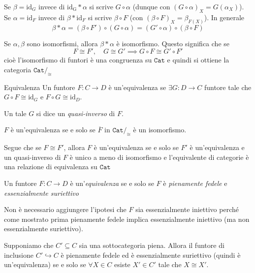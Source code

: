\begin{note}[zione]
    Se \(\beta = \mathrm{id}_G \) invece di \(\mathrm{id_G} * \alpha\) si scrive
    \(G \circ \alpha\) (dunque con \({(G \circ \alpha)}_X = G{(\alpha_X)}\)). Se
    \(\alpha = \mathrm{id}_F\) invece di \(\beta * \mathrm{id}_F\) si scrive \(\beta \circ F\) (con \({(\beta \circ F)}_X = \beta_{F{(X)}} \)). In generale 
    \[
      \beta * \alpha = {(\beta \circ F')} \circ {(G \circ \alpha)} = {(G' \circ
      \alpha)} \circ {(\beta \circ F)}
    \]
\end{note}
\begin{remark}{}
    Se \(\alpha, \beta\) sono isomorfismi, allora \(\beta * \alpha\) è
    isomorfismo. Questo significa che se 
    \[
      F \cong F', \quad G \cong G' \implies G \circ F \cong G' \circ F'
    \]
    cioè l'isomorfismo di funtori è una congruenza su \(
    \mathtt{Cat}\) e quindi si ottiene la categoria \(\mathtt{Cat} /_{\cong}\)
\end{remark}
\begin{definition}{Equivalenza}
    Un funtore \(F: C \to D\) è un'equivalenza se \(\exists G : D \to C\)
    funtore tale che \(G \circ F \cong \mathrm{id}_G\) e \(F \circ G \cong \mathrm{id}_D\).

    Un tale \(G\) si dice un \emph{quasi-inverso} di \(F\).
\end{definition}
\begin{remark}{}
    \(F\) è un'equivalenza se e solo se \(\overline{F} \text{ in } \mathtt{Cat}/_{\cong} \) è un isomorfismo.
\end{remark}

Segue che se \(F \cong F'\), allora \(F\) è un'equivalenza se e solo se \(F'\) è
un'equivalenza e un quasi-inverso di \(F\) è unico a meno di isomorfismo e
l'equivalente di categorie è una relazione di equivalenza su \(\mathtt{Cat}\) 

\begin{theorem}
    Un funtore \(F : C \to D\) è un'\emph{equivalenza} se e solo se \(F\) è \emph{pienamente fedele} e \emph{essenzialmente suriettivo}
\end{theorem}
\begin{remark}{}
    Non è necessario aggiungere l'ipotesi che \(F\) sia essenzialmente iniettivo
    perché come mostrato prima pienamente fedele implica essenzialmente
    iniettivo (ma non essenzialmente suriettivo).
\end{remark}
\begin{example}{}
    Supponiamo che \(C' \subseteq C \) sia una sottocategoria piena. Allora il
    funtore di inclusione \(C' \hookrightarrow C\) è pienamente fedele ed è
    essenzialmente suriettivo (quindi è un'equivalenza) se e solo se \(\forall X \in C\) esiste \(X' \in C'\) tale che \(X \cong X'\).
\end{example}


